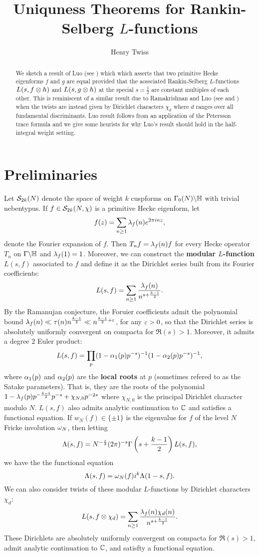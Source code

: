 \documentclass[12pt,reqno,oneside]{amsart}
\title{Uniquness Theorems for Rankin-Selberg \texorpdfstring{$L$}{L}-functions}
\author{Henry Twiss}
\begin{document}
\begin{abstract}
    We sketch a result of Luo (see \cite{L}) which which asserts that two primitive Hecke eigenforms $f$ and $g$ are equal provided that the aossciated Rankin-Selberg $L$-functions $L(s,f \otimes h)$ and $L(s,g \otimes h)$ at the special $s = \frac{1}{2}$ are constant multiples of each other. This is reminiscent of a similar result due to Ramakrishnan and Luo (see \cite{LR-1} and \cite{LR-2}) when the twists are instead given by Dirichlet characters $\chi_{d}$ where $d$ ranges over all fundamental discriminants. Luo result follows from an application of the Petersson trace formula and we give some heurists for why Luo's result should hold in the half-integral weight setting.
\end{abstract}

\maketitle

\section{Preliminaries}
    Let $\mathcal{S}_{2k}(N)$ denote the space of weight $k$ cuspforms on $\Gamma_{0}(N)\backslash\mathbb{H}$ with trivial nebentypus. If $f \in \mathcal{S}_{2k}(N,\chi)$ is a primitive Hecke eigenform, let
    \[
        f(z) = \sum_{n \ge 1}\lambda_{f}(n)e^{2\pi inz},
    \]
    denote the Fourier expansion of $f$. Then $T_{n}f = \lambda_{f}(n)f$ for every Hecke operator $T_{n}$ on $\Gamma\backslash\mathbb{H}$ and $\lambda_{f}(1) = 1$. Moreover, we can construct the \textbf{modular $L$-function} $L(s,f)$ associated to $f$ and define it as the Dirichlet series built from its Fourier coefficients:
    \[
        L(s,f) = \sum_{n \ge 1}\frac{\lambda_{f}(n)}{n^{s+\frac{k-1}{2}}}.
    \]
    By the Ramanujan conjecture, the Foruier coefficients admit the polynomial bound $\lambda_{f}(n) \ll \tau(n)n^{\frac{k-1}{2}} \ll n^{\frac{k-1}{2}+\varepsilon}$, for any $\varepsilon > 0$, so that the Dirichlet series is absolutely uniformly convergent on compacta for $\Re(s) > 1$. Moreover, it admits a degree $2$ Euler product:
    \[
        L(s,f) = \prod_{p}(1-\alpha_{1}(p)p^{-s})^{-1}(1-\alpha_{2}(p)p^{-s})^{-1},
    \]
    where $\alpha_{1}(p)$ and $\alpha_{2}(p)$ are the \textbf{local roots} at $p$ (sometimes refered to as the Satake parameters). That is, they are the roots of the polynomial $1-\lambda_{f}(p)p^{-\frac{k-1}{2}}p^{-s}+\chi_{N,0}p^{-2s}$ where $\chi_{N,0}$ is the principal Dirichlet character modulo $N$. $L(s,f)$ also admits analytic continuation to $\mathbb{C}$ and satisfies a functional equation. If $w_{N}(f) \in \{\pm 1\}$ is the eigenvalue for $f$ of the level $N$ Fricke involution $\omega_{N}$, then letting
    \[
        \Lambda(s,f) = N^{-\frac{s}{2}}(2\pi)^{-s}\Gamma\left(s+\frac{k-1}{2}\right)L(s,f),
    \]
    we have the the functional equation
    \[
        \Lambda(s,f) = \omega_{N}(f)i^{k}\Lambda(1-s,f).
    \]
    We can also consider twists of these modular $L$-functions by Dirichlet characters $\chi_{d}$:
    \[
        L(s,f \otimes \chi_{d}) = \sum_{n \ge 1}\frac{\lambda_{f}(n)\chi_{d}(n)}{n^{s+\frac{k-1}{2}}}.
    \]
    These Dirichlets are absolutely uniformly convergent on compacta for $\Re(s) > 1$, admit analytic continuation to $\mathbb{C}$, and satisfty a functional equation.
\end{document}
